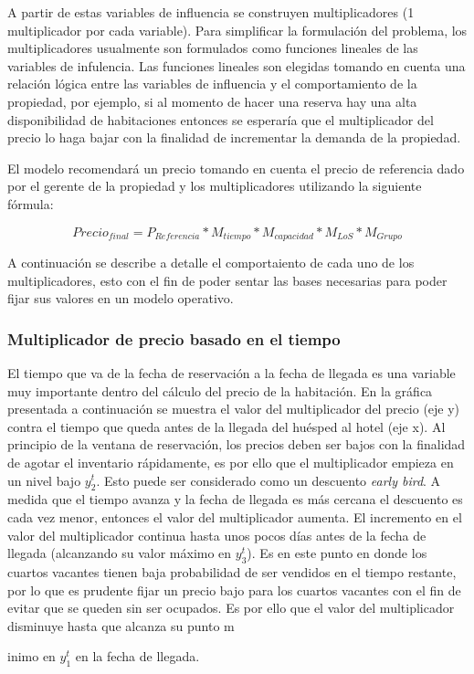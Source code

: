 {A partir de estas variables de influencia se construyen multiplicadores (1 multiplicador por cada variable). Para simplificar la formulación del problema, los multiplicadores usualmente son formulados como funciones lineales de las variables de infulencia. Las funciones lineales son elegidas tomando en cuenta una relación lógica entre las variables de influencia y el comportamiento de la propiedad, por ejemplo, si al momento de hacer una reserva hay una alta disponibilidad de habitaciones entonces se esperaría que el multiplicador del precio lo haga bajar con la finalidad de incrementar la demanda de la propiedad.

El modelo recomendará un precio tomando en cuenta el precio de referencia dado por el gerente de la propiedad y los multiplicadores utilizando la siguiente fórmula:

$$Precio_{final} = P_{Referencia} * M_{tiempo} * M_{capacidad} * M_{LoS} * M_{Grupo}$$

A continuación se describe a detalle el comportaiento de cada uno de los multiplicadores, esto con el fin de poder sentar las bases necesarias para poder fijar sus valores en un modelo operativo.

\subsubsection*{Multiplicador de precio basado en el tiempo}

El tiempo que va de la fecha de reservación a la fecha de llegada es una variable muy importante dentro del cálculo del precio de la habitación. En la gráfica presentada a continuación se muestra el valor del multiplicador del precio (eje y) contra el tiempo que queda antes de la llegada del huésped al hotel (eje x). Al principio de la ventana de reservación, los precios deben ser bajos con la finalidad de agotar el inventario rápidamente, es por ello que el multiplicador empieza en un nivel bajo $y_2^t$. Esto puede ser considerado como un descuento \emph{early bird}. A medida que el tiempo avanza y la fecha de llegada es más cercana el descuento es cada vez menor, entonces el valor del multiplicador aumenta. El incremento en el valor del multiplicador continua hasta unos pocos días antes de la fecha de llegada (alcanzando su valor máximo en $y_3^t$). Es en este punto en donde los cuartos vacantes tienen baja probabilidad de ser vendidos en el tiempo restante, por lo que es prudente fijar un precio bajo para los cuartos vacantes con el fin de evitar que se queden sin ser ocupados. Es por ello que el valor del multiplicador disminuye hasta que alcanza su punto m{inimo en $y_1^t$ en la fecha de llegada.

}}
